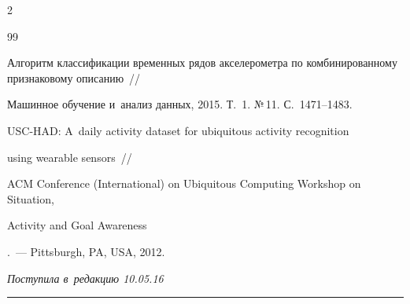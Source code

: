 \begin{multicols}{2}
{{\begin{thebibliography}{99}




 Алгоритм классификации временных рядов акселерометра по комбинированному признаковому описанию~//


 {Машинное обучение и~анализ данных}, 2015. Т.~1. №\,11. С.~1471--1483.









 USC-HAD: A~daily activity dataset for ubiquitous activity recognition 


 using wearable sensors~//


 {ACM Conference (International) on Ubiquitous Computing Workshop on Situation, 


 Activity and Goal Awareness}.~--- Pittsburgh, PA, USA, 2012.


 \end{thebibliography}





 }


 }





\end{multicols}










\hfill{\small\textit{Поступила в~редакцию 10.05.16}}





\vspace*{14pt}















\hrule





\vspace*{2pt}





